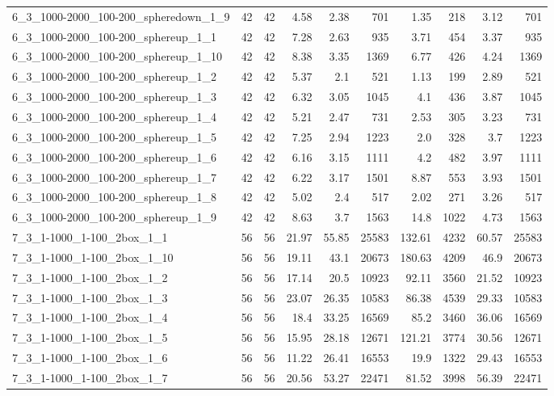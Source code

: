 \begin{center}
\begin{scriptsize}
\begin{longtable}{lrrrrrrrrr}
6\_3\_1000-2000\_100-200\_spheredown\_1\_9 & 42 & 42 & 4.58 & 2.38 & 701 & 1.35 & 218 & 3.12 & 701\\
6\_3\_1000-2000\_100-200\_sphereup\_1\_1 & 42 & 42 & 7.28 & 2.63 & 935 & 3.71 & 454 & 3.37 & 935\\
6\_3\_1000-2000\_100-200\_sphereup\_1\_10 & 42 & 42 & 8.38 & 3.35 & 1369 & 6.77 & 426 & 4.24 & 1369\\
6\_3\_1000-2000\_100-200\_sphereup\_1\_2 & 42 & 42 & 5.37 & 2.1 & 521 & 1.13 & 199 & 2.89 & 521\\
6\_3\_1000-2000\_100-200\_sphereup\_1\_3 & 42 & 42 & 6.32 & 3.05 & 1045 & 4.1 & 436 & 3.87 & 1045\\
6\_3\_1000-2000\_100-200\_sphereup\_1\_4 & 42 & 42 & 5.21 & 2.47 & 731 & 2.53 & 305 & 3.23 & 731\\
6\_3\_1000-2000\_100-200\_sphereup\_1\_5 & 42 & 42 & 7.25 & 2.94 & 1223 & 2.0 & 328 & 3.7 & 1223\\
6\_3\_1000-2000\_100-200\_sphereup\_1\_6 & 42 & 42 & 6.16 & 3.15 & 1111 & 4.2 & 482 & 3.97 & 1111\\
6\_3\_1000-2000\_100-200\_sphereup\_1\_7 & 42 & 42 & 6.22 & 3.17 & 1501 & 8.87 & 553 & 3.93 & 1501\\
6\_3\_1000-2000\_100-200\_sphereup\_1\_8 & 42 & 42 & 5.02 & 2.4 & 517 & 2.02 & 271 & 3.26 & 517\\
6\_3\_1000-2000\_100-200\_sphereup\_1\_9 & 42 & 42 & 8.63 & 3.7 & 1563 & 14.8 & 1022 & 4.73 & 1563\\
7\_3\_1-1000\_1-100\_2box\_1\_1 & 56 & 56 & 21.97 & 55.85 & 25583 & 132.61 & 4232 & 60.57 & 25583\\
7\_3\_1-1000\_1-100\_2box\_1\_10 & 56 & 56 & 19.11 & 43.1 & 20673 & 180.63 & 4209 & 46.9 & 20673\\
7\_3\_1-1000\_1-100\_2box\_1\_2 & 56 & 56 & 17.14 & 20.5 & 10923 & 92.11 & 3560 & 21.52 & 10923\\
7\_3\_1-1000\_1-100\_2box\_1\_3 & 56 & 56 & 23.07 & 26.35 & 10583 & 86.38 & 4539 & 29.33 & 10583\\
7\_3\_1-1000\_1-100\_2box\_1\_4 & 56 & 56 & 18.4 & 33.25 & 16569 & 85.2 & 3460 & 36.06 & 16569\\
7\_3\_1-1000\_1-100\_2box\_1\_5 & 56 & 56 & 15.95 & 28.18 & 12671 & 121.21 & 3774 & 30.56 & 12671\\
7\_3\_1-1000\_1-100\_2box\_1\_6 & 56 & 56 & 11.22 & 26.41 & 16553 & 19.9 & 1322 & 29.43 & 16553\\
7\_3\_1-1000\_1-100\_2box\_1\_7 & 56 & 56 & 20.56 & 53.27 & 22471 & 81.52 & 3998 & 56.39 & 22471\\

\end{longtable}
\end{scriptsize}
\end{center}
